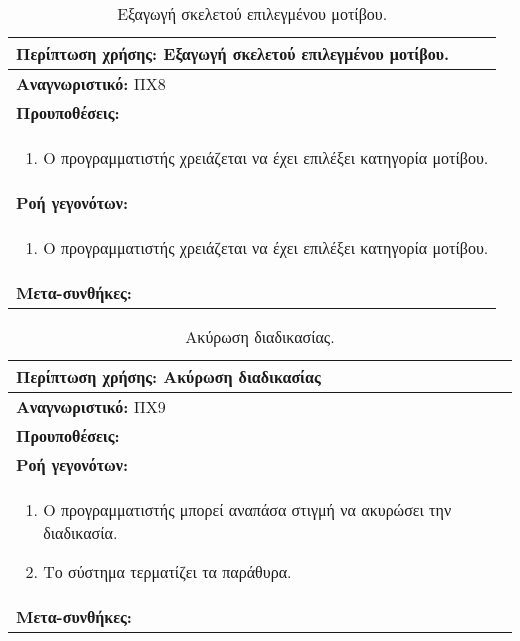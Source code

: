 \begin{table}[H]
	\hspace*{-0.2cm}
    \centering
    \scriptsize
	\begin{tabular}{|p{10cm}|}
	\hline
		\textbf{Περίπτωση χρήσης:} Εξαγωγή σκελετού επιλεγμένου μοτίβου. \\
	\hline
		\textbf{Αναγνωριστικό:} ΠΧ8 \\ 
	\hline	
		\textbf{Προυποθέσεις:} \\
		\begin{enumerate}
		 \item Ο προγραμματιστής χρειάζεται να έχει επιλέξει κατηγορία μοτίβου.
		\end{enumerate} \\
	\hline
		\textbf{Ροή γεγονότων:} \\
		\begin{enumerate}
		 \item Ο προγραμματιστής χρειάζεται να έχει επιλέξει κατηγορία μοτίβου.
		\end{enumerate} \\
	\hline
		\textbf{Μετα-συνθήκες:} \\
	\hline
    \end{tabular}
    \caption{Εξαγωγή σκελετού επιλεγμένου μοτίβου.}
    \label{tab:createPatternUC}
\end{table}
\begin{table}[H]
	\hspace*{-0.2cm}
    \centering
    \scriptsize
	\begin{tabular}{|p{10cm}|}
	\hline
		\textbf{Περίπτωση χρήσης:} Ακύρωση διαδικασίας \\
	\hline
		\textbf{Αναγνωριστικό:} ΠΧ9 \\
	\hline	
		\textbf{Προυποθέσεις:} \\
	\hline
		\textbf{Ροή γεγονότων:} \\
		\begin{enumerate}
		 \item Ο προγραμματιστής μπορεί αναπάσα στιγμή να ακυρώσει την διαδικασία.
 		 \item Το σύστημα τερματίζει τα παράθυρα.
		\end{enumerate} \\
	\hline
		\textbf{Μετα-συνθήκες:} \\
	\hline
    \end{tabular}
    \caption{Ακύρωση διαδικασίας.}
    \label{tab:cancelUC}
\end{table}
\label{sec:useCases}